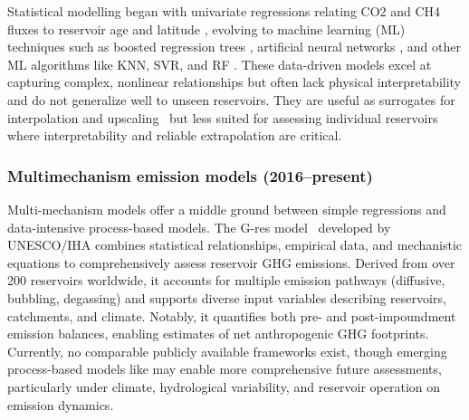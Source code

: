\documentclass[10pt]{article}
\begin{document}
Statistical modelling began with univariate regressions relating \ac{CO2} and \ac{CH4} fluxes to reservoir age and latitude \cite{Barros2011}, evolving to machine learning (ML) techniques such as boosted regression trees \cite{Beaulieu2020b}, artificial neural networks \cite{Yang2018, chen2018}, and other ML algorithms like \ac{KNN}, \ac{SVR}, and \ac{RF} \cite{WANG2025123441}. 
These data-driven models excel at capturing complex, nonlinear relationships but often lack physical interpretability and do not generalize well to unseen reservoirs. 
They are useful as surrogates for interpolation and upscaling~\cite{Beaulieu2020b} but less suited for assessing individual reservoirs where interpretability and reliable extrapolation are critical.

\subsubsection{Multimechanism emission models (2016--present)}
\label{sec:multimechanism_models}

Multi-mechanism models offer a middle ground between simple regressions and data-intensive process-based models. 
The G-res model~\cite{Prairie2017b, Prairie2021} developed by UNESCO/IHA combines statistical relationships, empirical data, and mechanistic equations to comprehensively assess reservoir \ac{GHG} emissions. 
Derived from over 200 reservoirs worldwide, it accounts for multiple emission pathways (diffusive, bubbling, degassing) and supports diverse input variables describing reservoirs, catchments, and climate. 
Notably, it quantifies both pre- and post-impoundment emission balances, enabling estimates of net anthropogenic \ac{GHG} footprints.
Currently, no comparable publicly available frameworks exist, though emerging process-based models like \citet{SHI2025} may enable more comprehensive future assessments, particularly under climate, hydrological variability, and reservoir operation on emission dynamics.
\end{document}
